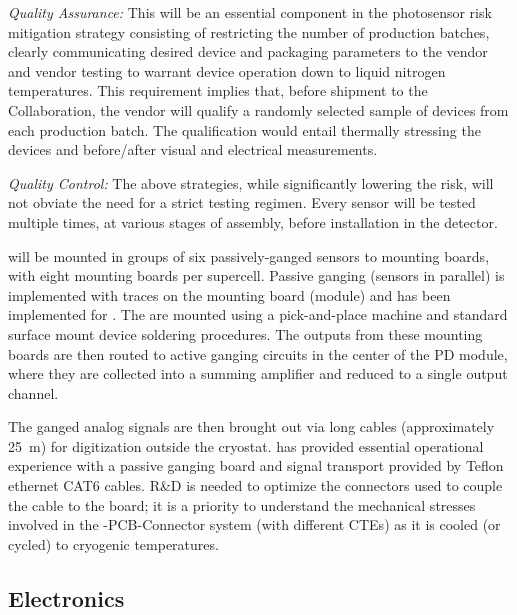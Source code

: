 {\it{Quality Assurance:}} This will be an essential component in the photosensor risk mitigation strategy consisting of restricting the number of production batches, clearly communicating desired device and packaging parameters to the vendor and vendor testing to warrant device operation down to liquid nitrogen temperatures. This requirement implies that, before shipment to the Collaboration, the vendor will qualify a randomly selected sample of devices from each production batch. The qualification would entail thermally stressing the devices and before/after visual and electrical measurements. 

{\it{Quality Control:}} The above strategies, while significantly lowering the risk, will not obviate the need for a strict testing regimen. Every sensor will be tested multiple times, at various stages of assembly, before installation in the detector.

 will be mounted in groups of six passively-ganged sensors to mounting boards, with eight mounting boards per supercell.  Passive ganging (sensors in parallel) is implemented with traces on the  mounting board (module) and has been implemented for .  The  are mounted using a pick-and-place machine and standard surface mount device soldering procedures. The outputs from these mounting boards are then routed to active ganging circuits in the center of the PD module, where they are collected into a summing amplifier and reduced to a single output channel.


The ganged analog signals are then brought out via long cables (approximately \SI{25}{m}) for digitization outside the cryostat.
 has provided essential operational experience with a passive ganging board and signal transport provided by Teflon ethernet CAT6 cables.
R\&D is needed to optimize the connectors used to couple the cable to the board;  it is a priority to understand the mechanical stresses involved in the -PCB-Connector system (with different CTEs) as it is cooled (or cycled) to cryogenic temperatures.


\subsection{Electronics}
\label{sec:fdsp-pd-assy-pde}

